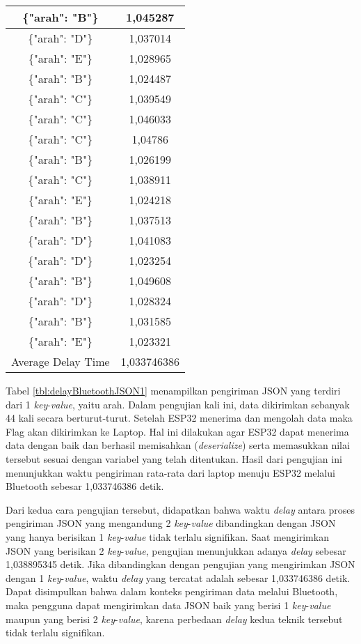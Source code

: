 \begin{table}[!ht]
\begin{tabular}{|c|c|}
  \{"arah": "B"\}    & 1,045287    \\ \hline
  \{"arah": "D"\}    & 1,037014    \\ \hline
  \{"arah": "E"\}    & 1,028965    \\ \hline
  \{"arah": "B"\}    & 1,024487    \\ \hline
  \{"arah": "C"\}    & 1,039549    \\ \hline
  \{"arah": "C"\}    & 1,046033    \\ \hline
  \{"arah": "C"\}    & 1,04786     \\ \hline
  \{"arah": "B"\}    & 1,026199    \\ \hline
  \{"arah": "C"\}    & 1,038911    \\ \hline
  \{"arah": "E"\}    & 1,024218    \\ \hline
  \{"arah": "B"\}    & 1,037513    \\ \hline
  \{"arah": "D"\}    & 1,041083    \\ \hline
  \{"arah": "D"\}    & 1,023254    \\ \hline
  \{"arah": "B"\}    & 1,049608    \\ \hline
  \{"arah": "D"\}    & 1,028324    \\ \hline
  \{"arah": "B"\}    & 1,031585    \\ \hline
  \{"arah": "E"\}    & 1,023321    \\ \hline
  Average Delay Time & 1,033746386 \\ \hline
  \end{tabular}
\end{table}

Tabel \ref{tbl:delayBluetoothJSON1} menampilkan pengiriman JSON yang terdiri dari 1 \emph{key}-\emph{value}, yaitu arah. Dalam pengujian kali ini, data dikirimkan sebanyak 44 kali secara berturut-turut. Setelah ESP32 menerima dan mengolah data maka Flag akan dikirimkan ke Laptop. Hal ini dilakukan agar ESP32 dapat menerima data dengan baik dan berhasil memisahkan (\emph{deserialize}) serta memasukkan nilai tersebut sesuai dengan variabel yang telah ditentukan. Hasil dari pengujian ini menunjukkan waktu pengiriman rata-rata dari laptop menuju ESP32 melalui Bluetooth sebesar 1,033746386 detik.

Dari kedua cara pengujian tersebut, didapatkan bahwa waktu \emph{delay} antara proses pengiriman JSON yang mengandung 2 \emph{key}-\emph{value} dibandingkan dengan JSON yang hanya berisikan 1 \emph{key}-\emph{value} tidak terlalu signifikan. Saat mengirimkan JSON yang berisikan 2 \emph{key}-\emph{value}, pengujian menunjukkan adanya \emph{delay} sebesar 1,038895345 detik. Jika dibandingkan dengan pengujian yang mengirimkan JSON dengan 1 \emph{key}-\emph{value}, waktu \emph{delay} yang tercatat adalah sebesar 1,033746386 detik. Dapat disimpulkan bahwa dalam konteks pengiriman data melalui Bluetooth, maka pengguna dapat mengirimkan data JSON baik yang berisi 1 \emph{key}-\emph{value} maupun yang berisi 2 \emph{key}-\emph{value}, karena perbedaan \emph{delay} kedua teknik tersebut tidak terlalu signifikan.

